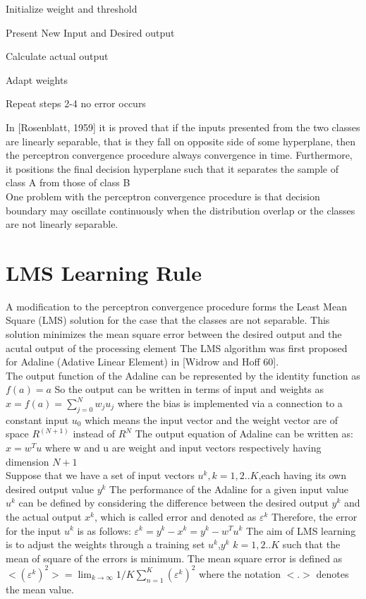 \documentclass[12pt, a4paper, twoside]{book}
\begin{document}
\begin{steps}
    \item Initialize weight and threshold
    \item Present New Input and Desired output
    \item Calculate actual output
    \item Adapt weights
    \item Repeat steps 2-4 no error occurs
\end{steps}

In [Rosenblatt, 1959] it is proved that if the inputs presented from the two classes
are linearly separable, that is they fall on opposite side of some hyperplane, then the perceptron convergence
procedure always convergence in time. Furthermore, it positions the final decision hyperplane such that it separates the sample of class A
from those of class B \\

One problem with the perceptron convergence procedure is that decision boundary may oscillate continuously when the distribution overlap or the classes are not linearly separable.

\section{LMS Learning Rule}
A modification to the perceptron convergence procedure forms the Least Mean Square (LMS) solution for the case that the classes are not separable.
This solution minimizes the mean square error between the desired output and the acutal output of the processing element
The LMS algorithm was first proposed for Adaline (Adative Linear Element) in [Widrow and Hoff 60]. \\


The output function of the Adaline can be represented by the identity function as $f(a)=a$
So the output can be written in terms of input and weights as $x=f(a)=\sum_{j = 0}^{N} w_ju_j$ where the bias is implemented via a connection to a constant input $u_0$ 
which means the input vector and the weight vector are of space $R^{(N+1)}$ instead of $R^N$ 
The output equation of Adaline can be written as: $ x=w^Tu$ where w and u are weight and input vectors respectively having dimension $N+1$ \\
  

Suppose that we have a set of input vectors $u^k, k=1,2..K$,each having its own desired output value $y^k$
The performance of the Adaline for a given input value $u^k$ can be defined by considering the difference between the desired output $y^k$ and 
the actual output $x^k$, which is called error and denoted as $\varepsilon^k$
Therefore, the error for the input $u^k$ is as follows: $\varepsilon^k=y^k-x^k=y^k-w^Tu^k$
The aim of LMS learning is to adjust the weights through a training set {{$u^k$,$y^k$}} $k=1,2..K$ such that the mean of square of the errors is minimum.
The mean square error is defined as $<(\varepsilon^k)^2>= \lim_{k \to \infty} 1/K \sum_{n = 1}^{K}(\varepsilon^k)^2$ where the notation $<.>$ denotes the mean value. 
\end{document}
